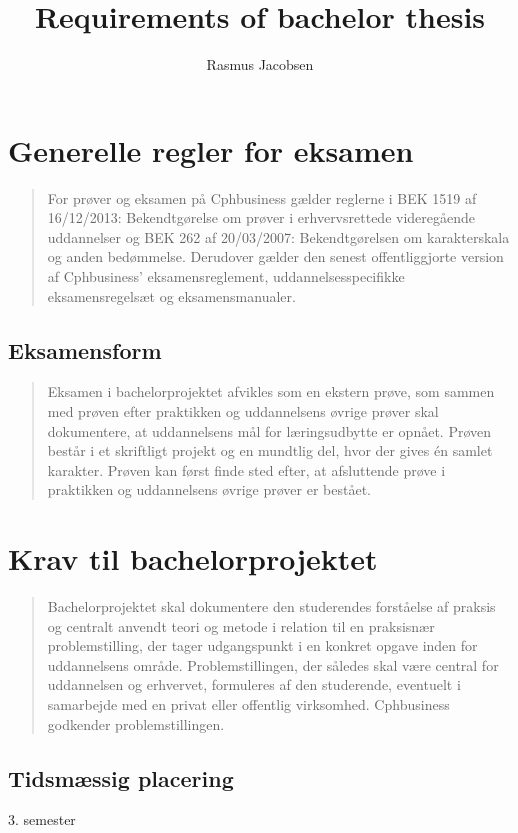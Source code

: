 \documentclass{article}
\title{Requirements of bachelor thesis}
\author{Rasmus Jacobsen}
\begin{document}
\maketitle

\section{Generelle regler for eksamen}

\begin{quote}
For prøver og eksamen på Cphbusiness gælder reglerne i BEK 1519 af 16/12/2013:
Bekendtgørelse om prøver i erhvervsrettede videregående uddannelser og BEK 262 af 20/03/2007: Bekendtgørelsen om karakterskala og anden bedømmelse. Derudover
gælder den senest offentliggjorte version af Cphbusiness’ eksamensreglement, uddannelsesspecifikke eksamensregelsæt og eksamensmanualer.

\end{quote}

\subsection{Eksamensform}
\begin{quote}
Eksamen i bachelorprojektet afvikles som en ekstern prøve, som sammen med prøven efter praktikken og uddannelsens øvrige prøver skal dokumentere, at uddannelsens mål for læringsudbytte er opnået. Prøven består i et skriftligt projekt og en
mundtlig del, hvor der gives én samlet karakter. Prøven kan først finde sted efter, at
afsluttende prøve i praktikken og uddannelsens øvrige prøver er bestået.
\end{quote}

\section{Krav til bachelorprojektet}

\begin{quote}
Bachelorprojektet skal dokumentere den studerendes forståelse af praksis og centralt
anvendt teori og metode i relation til en praksisnær problemstilling, der tager udgangspunkt i en konkret opgave inden for uddannelsens område. Problemstillingen,
der således skal være central for uddannelsen og erhvervet, formuleres af den studerende, eventuelt i samarbejde med en privat eller offentlig virksomhed. Cphbusiness
godkender problemstillingen.
\end{quote}

\subsection{Tidsmæssig placering}
3. semester
\end{document}
